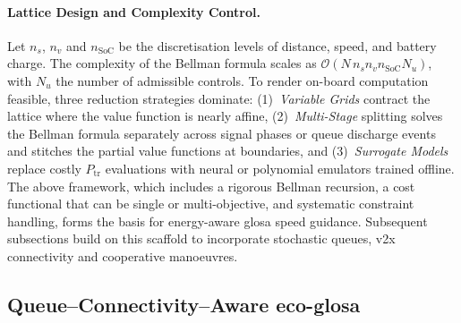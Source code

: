 \paragraph{Lattice Design and Complexity Control.}
Let $n_s$, $n_v$ and $n_{\mathrm{SoC}}$ be the discretisation levels of distance, speed, and battery charge. The complexity of the Bellman formula scales as $\mathcal O(N\,n_s n_v n_{\mathrm{SoC}} N_u)$, with $N_u$ the number of admissible controls. To render on-board computation feasible, three reduction strategies dominate:  
(1)~\textit{Variable Grids} contract the lattice where the value function is nearly affine,  
(2)~\textit{Multi-Stage} splitting solves the Bellman formula separately across signal phases or queue discharge events and stitches the partial value functions at boundaries, and  
(3)~\textit{Surrogate Models} replace costly $P_{\text{tr}}$ evaluations with neural or polynomial emulators trained offline.
\mynewline
The above framework, which includes a rigorous Bellman recursion, a cost functional that can be single or multi-objective, and systematic constraint handling, forms the basis for energy-aware \ac{glosa} speed guidance. Subsequent subsections build on this scaffold to incorporate stochastic queues, \ac{v2x} connectivity and cooperative manoeuvres.

\subsection{Queue–Connectivity–Aware \ac{eco-glosa}}
\label{subsec:eco_dp_queue}

